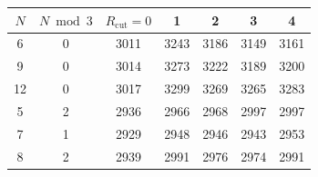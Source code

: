 \begin{tabular}{c c ccccc}
    \hline\hline
    $N$ & $N \bmod 3$ & $R_\text{cut}=0$ & 1 & 2 & 3 & 4 \\
    \hline
    6  & 0 & 3011 & 3243 & 3186 & 3149 & 3161 \\
    9  & 0 & 3014 & 3273 & 3222 & 3189 & 3200 \\
    12 & 0 & 3017 & 3299 & 3269 & 3265 & 3283 \\
    \hline
    5  & 2 & 2936 & 2966 & 2968 & 2997 & 2997 \\
    7  & 1 & 2929 & 2948 & 2946 & 2943 & 2953 \\
    8  & 2 & 2939 & 2991 & 2976 & 2974 & 2991 \\
    \hline\hline
\end{tabular}
